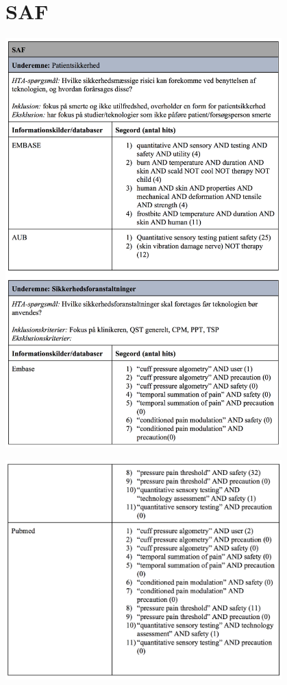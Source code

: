 \section{SAF}
\includegraphics[width=0.8\textwidth]{rapportAfsnit/qBilag/sogninger/SAF1}

\includegraphics[width=0.8\textwidth]{rapportAfsnit/qBilag/sogninger/SAF2}

